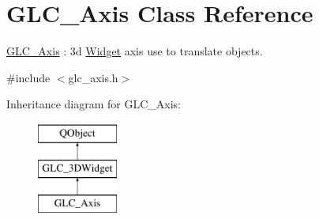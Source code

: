 \hypertarget{class_g_l_c___axis}{\section{G\-L\-C\-\_\-\-Axis Class Reference}
\label{class_g_l_c___axis}
}


\hyperlink{class_g_l_c___axis}{G\-L\-C\-\_\-\-Axis} \-: 3d \hyperlink{class_widget}{Widget} axis use to translate objects.  




{\ttfamily \#include $<$glc\-\_\-axis.\-h$>$}

Inheritance diagram for G\-L\-C\-\_\-\-Axis\-:\begin{figure}[H]
\begin{center}
\leavevmode
\includegraphics[height=3.000000cm]{class_g_l_c___axis}
\end{center}
\end{figure}
